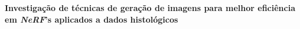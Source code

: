\documentclass[12pt,a4paper]{article}
\begin{document}



%



{\large \bfseries Investigação de técnicas de geração de imagens para melhor eficiência em \textit{NeRF}'s aplicados a dados histológicos}



\newpage




\newpage




\end{document}

